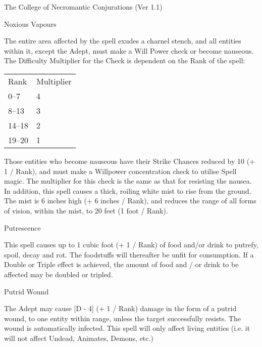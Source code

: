 \begin{Chapter}{The College of Necromantic Conjurations (Ver 1.1)}
\begin{spell}[G-6]{Noxious Vapours}
\begin{effects}
The entire area affected by the spell exudes a charnel stench, and all
entities within it, except the Adept, must make a Will Power check or
become nauseous.  The Difficulty Multiplier for the Check is dependent
on the Rank of the spell:

\begin{tabularx}{\columnwidth}{lX}
Rank	& Multiplier \\
0--7	& 4 \\
8--13	& 3 \\
14--18	& 2 \\
19--20	& 1 \\
\end{tabularx}

Those entities who become nauseous have their Strike Chances reduced
by 10 (+ 1 / Rank), and must make a Willpower concentration check to
utilise Spell magic. The multiplier for this check is the same as that
for resisting the nausea.  In addition, this spell causes a thick,
roiling white mist to rise from the ground. The mist is 6 inches high
(+ 6 inches / Rank), and reduces the range of all forms of vision,
within the mist, to 20 feet (1 foot / Rank).
\end{effects}
\end{spell}

\begin{spell}[G-7]{Putrescence}
\begin{effects}
This spell causes up to 1 cubic foot (+ 1 / Rank) of food and/or drink
to putrefy, spoil, decay and rot.  The foodstuffs will thereafter be
unfit for consumption.  If a Double or Triple effect is achieved, the
amount of food and / or drink to be affected may be doubled or
tripled.
\end{effects}
\end{spell}

\begin{spell}[G-8]{Putrid Wound}
\begin{effects}
The Adept may cause [D - 4] (+ 1 / Rank) damage in the form of a
putrid wound, to one entity within range, unless the target
successfully resists.  The wound is automatically infected.  This
spell will only affect living entities (i.e. it will not affect
Undead, Animates, Demons, etc.)
\end{effects}
\end{spell}


\end{Chapter}
